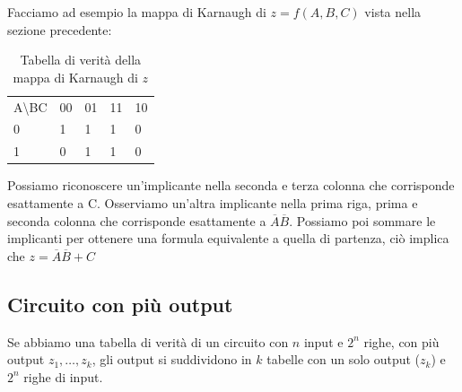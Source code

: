 Facciamo ad esempio la mappa di Karnaugh di $ z = f(A,B,C) $ vista nella sezione precedente:

\begin{table}[H]
	\centering
	\caption{Tabella di verità della mappa di Karnaugh di $z$}
	\label{tab:karnaugh}
	\begin{tabular}{lllll}
		A\textbackslash{}BC    & 00                     & 01                     & 11                     & 10                     \\ \cline{2-5} 
		\multicolumn{1}{l|}{0} & \multicolumn{1}{l|}{1} & \multicolumn{1}{l|}{1} & \multicolumn{1}{l|}{1} & \multicolumn{1}{l|}{0} \\ \cline{2-5} 
		\multicolumn{1}{l|}{1} & \multicolumn{1}{l|}{0} & \multicolumn{1}{l|}{1} & \multicolumn{1}{l|}{1} & \multicolumn{1}{l|}{0} \\ \cline{2-5} 
	\end{tabular}
\end{table}

Possiamo riconoscere un'implicante nella seconda e terza colonna che corrisponde esattamente a C. Osserviamo un'altra implicante nella prima riga, prima e seconda colonna che corrisponde esattamente a $ \overbar{A}\overbar{B} $. Possiamo poi sommare le implicanti per ottenere una formula equivalente a quella di partenza, ciò implica che $ z =  \overbar{A}\overbar{B} + C $


\subsection{Circuito con più output}
Se abbiamo una tabella di verità di un circuito con $ n $ input e $ 2^n $ righe, con più output $ z_1, \dots, z_k $, gli output si suddividono in $ k $ tabelle con un solo output ($ z_k $) e $ 2^n $ righe di input.